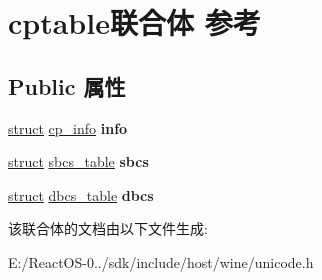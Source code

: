 \hypertarget{unioncptable}{}\section{cptable联合体 参考}
\label{unioncptable}
\subsection*{Public 属性}
\begin{DoxyCompactItemize}
\item 
\mbox{\label{unioncptable_ac5d5ca1bd8bdce53c5591a209f33384f}} 
\hyperlink{interfacestruct}{struct} \hyperlink{structcp__info}{cp\+\_\+info} {\bfseries info}
\item 
\mbox{\label{unioncptable_a943ac67003b3313c3c93b0906e109016}} 
\hyperlink{interfacestruct}{struct} \hyperlink{structsbcs__table}{sbcs\+\_\+table} {\bfseries sbcs}
\item 
\mbox{\label{unioncptable_a365665055dae24ec81df2e0bfe63632e}} 
\hyperlink{interfacestruct}{struct} \hyperlink{structdbcs__table}{dbcs\+\_\+table} {\bfseries dbcs}
\end{DoxyCompactItemize}


该联合体的文档由以下文件生成\+:\begin{DoxyCompactItemize}
\item 
E\+:/\+React\+O\+S-\/0../sdk/include/host/wine/unicode.\+h\end{DoxyCompactItemize}
